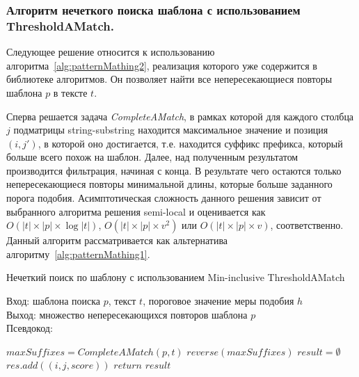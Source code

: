 \subsubsection{Алгоритм нечеткого поиска шаблона с использованием ThresholdAMatch.}
Следующее решение относится к использованию алгоритма~\ref{alg:patternMathing2}, реализация которого уже содержится в библиотеке алгоритмов.
Он позволяет найти все непересекающиеся повторы шаблона $p$ в тексте $t$.

Сперва решается задача \emph{CompleteAMatch}, в рамках которой для каждого столбца $j$ подматрицы string-substring находится максимальное значение и позиция $(i,j')$, в которой оно достигается, т.е. находится суффикс префикса, который больше всего похож на шаблон.
Далее, над полученным результатом производится фильтрация, начиная с конца.
В результате чего остаются только непересекающиеся повторы минимальной длины, которые больше заданного порога подобия.
Асимптотическая сложность данного решения зависит от выбранного алгоритма решения semi-local и оценивается как  $O(|t| \times |p| \times \log |t|)$, $O(|t| \times |p| \times v^2)$ или $O(|t| \times |p| \times v)$, 
соответственно.
Данный алгоритм рассматривается как альтернатива алгоритму~\ref{alg:patternMathing1}.

\begin{algorithm}[b!]
\caption{Нечеткий поиск по шаблону с использованием Min-inclusive ThresholdAMatch}\label{alg:patternMathing2}
Вход: шаблона поиска $p$, текст $t$, пороговое значение меры подобия $h$\\
Выход: множество непересекающихся повторов шаблона $p$\\
Псевдокод:
\begin{algorithmic}[1]
\State $maxSuffixes= CompleteAMatch(p,t)$
\State $reverse(maxSuffixes)$
\State $result = \emptyset$
    \State $res.add((i,j,score))$ 
    \EndIf
\EndFor
\State $return$ $result$

\end{algorithmic}
\end{algorithm}


